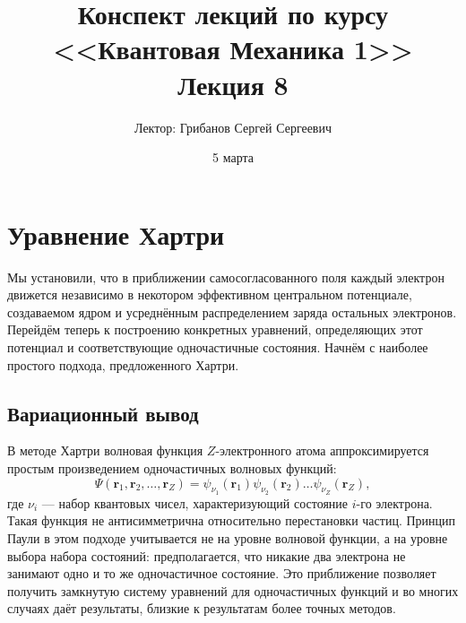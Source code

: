 \documentclass[a4paper, 12pt]{article}
\title{Конспект лекций по курсу <<Квантовая Механика 1>>  \\ \large Лекция 8}
\author{Лектор: Грибанов Сергей Сергеевич}
\date{5 марта}
\numberwithin{equation}{section}
\begin{document}
\maketitle
\tableofcontents

\section{Уравнение Хартри}
\label{sec:hartree_equation}

Мы установили, что в приближении самосогласованного поля каждый электрон движется независимо в некотором эффективном центральном потенциале, создаваемом ядром и усреднённым распределением заряда остальных электронов. Перейдём теперь к построению конкретных уравнений, определяющих этот потенциал и соответствующие одночастичные состояния. Начнём с наиболее простого подхода, предложенного Хартри.

\subsection{Вариационный вывод}
\label{subsec:hartree_variational}

В методе Хартри волновая функция $Z$-электронного атома аппроксимируется простым произведением одночастичных волновых функций:
\begin{equation}
\label{eq:hartree_product}
\Psi(\bm{r}_1, \bm{r}_2, \dots, \bm{r}_Z) = \psi_{\nu_1}(\bm{r}_1) \psi_{\nu_2}(\bm{r}_2) \dots \psi_{\nu_Z}(\bm{r}_Z),
\end{equation}
где $\nu_i$ --- набор квантовых чисел, характеризующий состояние $i$-го электрона. Такая функция не антисимметрична относительно перестановки частиц. Принцип Паули в этом подходе учитывается не на уровне волновой функции, а на уровне выбора набора состояний: предполагается, что никакие два электрона не занимают одно и то же одночастичное состояние. Это приближение позволяет получить замкнутую систему уравнений для одночастичных функций и во многих случаях даёт результаты, близкие к результатам более точных методов.
\end{document}
